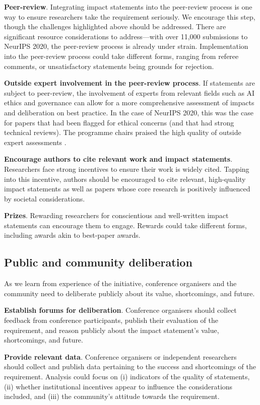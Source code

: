 \documentclass[11pt,english]{article}
\begin{document}
\textbf{Peer-review}. Integrating impact statements into the peer-review process is one way to ensure researchers take the requirement seriously. We encourage this step, though the challenges highlighted above should be addressed. There are significant resource considerations to address---with over 11,000 submissions to NeurIPS 2020, the peer-review process is already under strain. Implementation into the peer-review process could take different forms, ranging from referee comments, or unsatisfactory statements being grounds for rejection.

\textbf{Outside expert involvement in the peer-review process}. If statements are subject to peer-review, the involvement of experts from relevant fields such as AI ethics and governance can allow for a more comprehensive assessment of impacts and deliberation on best practice. In the case of NeurIPS 2020, this was the case for papers that had been flagged for ethical concerns (and that had strong technical reviews). The programme chairs praised the high quality of outside expert assessments \citep{lin_what_2020}.

\textbf{Encourage authors to cite relevant work and impact statements}. Researchers face strong incentives to ensure their work is widely cited. Tapping into this incentive, authors should be encouraged to cite relevant, high-quality impact statements as well as papers whose core research is positively influenced by societal considerations. 

\textbf{Prizes}. Rewarding researchers for conscientious and well-written impact statements can encourage them to engage. Rewards could take different forms, including awards akin to best-paper awards. 

\subsection{Public and community deliberation}

As we learn from experience of the initiative, conference organisers and the community need to deliberate publicly about its value, shortcomings, and future. 

\textbf{Establish forums for deliberation}. Conference organisers should collect feedback from conference participants, publish their evaluation of the requirement, and reason publicly about the impact statement's value, shortcomings, and future. 

\textbf{Provide relevant data}. Conference organisers or independent researchers should collect and publish data pertaining to the success and shortcomings of the requirement. Analysis could focus on (i) indicators of the quality of statements, (ii) whether institutional incentives appear to influence the considerations included, and (iii) the community's attitude towards the requirement. 
\end{document}
